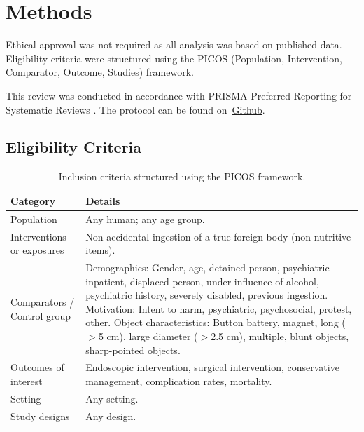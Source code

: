 \section{Methods}

\noindent Ethical approval was not required as all analysis was based on published data. Eligibility criteria were structured using the PICOS (Population, Intervention, Comparator, Outcome, Studies) framework. 

This review was conducted in accordance with PRISMA Preferred Reporting for Systematic Reviews \cite{pagePRISMA2020Statement2021}. The protocol can be found on~\href{https://github.com/jackgedge/iifo_systematic_review/blob/main/docs/plan.md}{Github}.


\subsection{Eligibility Criteria}

\begin{table}[tb]
\renewcommand{\arraystretch}{1.05}
\centering
\begin{tabular}{p{3.0cm} p{5.0cm}}
\toprule
\textbf{Category} & \textbf{Details} \\
\midrule

Population & Any human; any age group. \\
\midrule

Interventions or exposures & Non-accidental ingestion of a true foreign body (non-nutritive items). \\
\midrule

Comparators / Control group & 
Demographics: \newline
Gender, age, detained person, psychiatric inpatient, displaced person, under influence of alcohol, psychiatric history, severely disabled, previous ingestion. \newline
Motivation: \newline
Intent to harm, psychiatric, psychosocial, protest, other. \newline
Object characteristics: \newline
Button battery, magnet, long ($>$5 cm), large diameter ($>$2.5 cm), multiple, blunt objects, sharp-pointed objects. \\
\midrule

Outcomes of interest & Endoscopic intervention, surgical intervention, conservative management, complication rates, mortality. \\
\midrule

Setting & Any setting. \\
\midrule

Study designs & Any design. \\
\bottomrule
\end{tabular}
\caption{Inclusion criteria structured using the PICOS framework.}
\label{tab:inclusion-criteria-intro}
\end{table}

